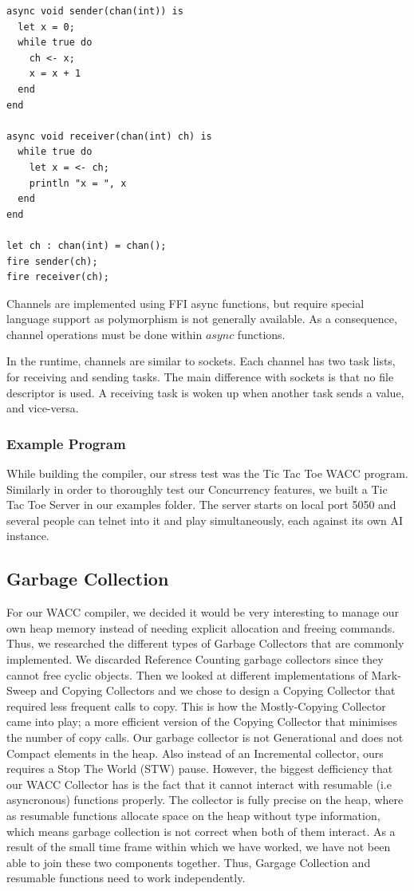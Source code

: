 \documentclass{article}
\begin{document}
\begin{lstlisting}
async void sender(chan(int)) is
  let x = 0;
  while true do
    ch <- x;
    x = x + 1
  end
end

async void receiver(chan(int) ch) is
  while true do
    let x = <- ch;
    println "x = ", x
  end
end

let ch : chan(int) = chan();
fire sender(ch);
fire receiver(ch);
\end{lstlisting}

Channels are implemented using FFI async functions, but require special language support as polymorphism is not generally
available. As a consequence, channel operations must be done within $async$ functions.

In the runtime, channels are similar to sockets. Each channel has two task lists, for receiving and sending tasks.
The main difference with sockets is that no file descriptor is used. A receiving task is woken up when another task sends
a value, and vice-versa.

\subsubsection{Example Program}
While building the compiler, our stress test was the Tic Tac Toe WACC program. Similarly in order to thoroughly test our Concurrency features, we built a
Tic Tac Toe Server in our examples folder. The server starts on local port 5050 and several people can telnet into it and play simultaneously, each against its
own AI instance. 


\subsection{Garbage Collection}
For our WACC compiler, we decided it would be very interesting to manage our own heap memory instead of needing explicit allocation and freeing commands. Thus, we researched the different types of Garbage Collectors that
are commonly implemented. We discarded Reference Counting garbage collectors since they cannot free cyclic objects. Then we looked at different implementations of Mark-Sweep and Copying Collectors and we chose to design a Copying Collector that required less frequent calls to copy. This is how the Mostly-Copying Collector came into play; a more efficient version of the Copying Collector that minimises the number of copy calls. Our garbage collector is not Generational and does not Compact elements in the heap. Also instead of an Incremental collector, ours requires a Stop The World (STW) pause. However, the biggest defficiency that our WACC Collector has is the fact that it cannot interact with resumable (i.e asyncronous) functions properly. The collector is fully precise on the heap, where as resumable functions allocate space on the heap without type information, which means garbage collection is not correct when both of them interact. As a result of the small time frame within which we have worked, we have not been able to join these two components together. Thus, Gargage Collection and resumable functions need to work independently. 
\end{document}
